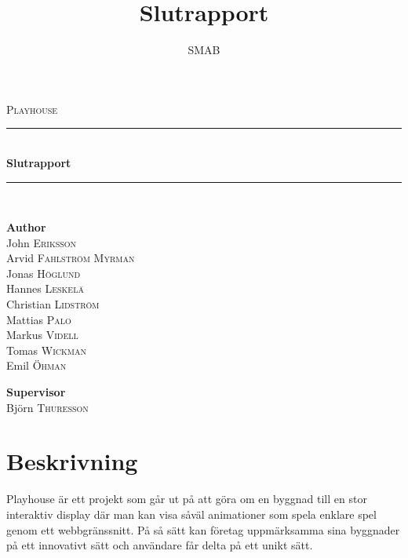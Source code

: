 \documentclass[a4paper,11pt]{article}
\title{Slutrapport}
\author{SMAB}
\begin{document}



\begin{titlepage}
\begin{center}

\newcommand{\HRule}{\rule{\linewidth}{0.5mm}}

\pagestyle{empty}

\textsc{\Large Playhouse}

\HRule \\[0.4cm]
{\huge \bfseries Slutrapport \\[0.4cm]}
\HRule \\[1.5cm]

\begin{minipage}[t]{0.4\textwidth}
  \begin{flushleft} \large
    \textbf{Author}\\
     John \textsc{Eriksson}          \\
     Arvid \textsc{Fahlström Myrman} \\
     Jonas \textsc{Höglund}          \\
     Hannes \textsc{Leskelä}         \\
     Christian \textsc{Lidström}     \\
     Mattias \textsc{Palo}           \\
     Markus \textsc{Videll}          \\
     Tomas \textsc{Wickman}          \\
     Emil \textsc{Öhman}
  \end{flushleft}
\end{minipage}
\begin{minipage}[t]{0.4\textwidth}
  \begin{flushright} \large
    \textbf{Supervisor}\\
    Björn \textsc{Thuresson}
  \end{flushright}
\end{minipage}

\vspace{2cm}

\section*{Beskrivning}
  \begin{flushleft}
  \par
  \begingroup
  \rightskip\leftskip
  Playhouse är ett projekt som går ut på att göra om en byggnad till en stor
  interaktiv display där man kan visa såväl animationer som spela enklare spel
  genom ett webbgränssnitt. På så sätt kan företag uppmärksamma sina byggnader
  på ett innovativt sätt och användare får delta på ett unikt sätt.
  \par
  \endgroup
  \end{flushleft}


\end{center}
\end{titlepage}
\end{document}
